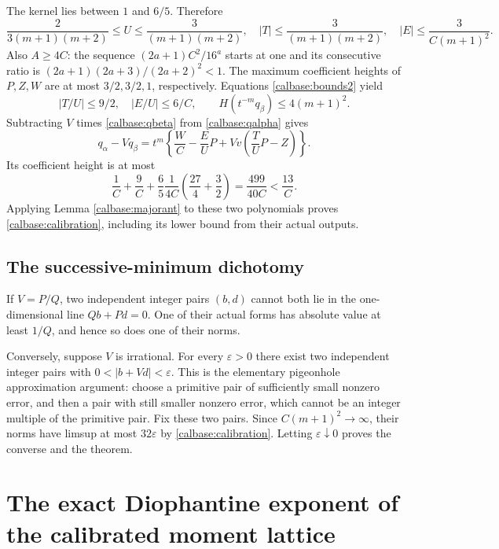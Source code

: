 \documentclass[11pt,a4paper]{article}
\numberwithin{equation}{section}
\theoremstyle{definition}\newtheorem{definition}[theorem]{Definition}
\theoremstyle{remark}\newtheorem{remark}[theorem]{Remark}
\begin{document}
The kernel lies between $1$ and $6/5$. Therefore
\begin{equation}\label{calbase:bounds2}
 \frac2{3(m+1)(m+2)}\le U\le\frac3{(m+1)(m+2)},\quad
 |T|\le\frac3{(m+1)(m+2)},\quad
 |E|\le\frac3{C(m+1)^2}.
\end{equation}
Also $A\ge4C$: the sequence $(2a+1)C^2/16^a$ starts at one
and its consecutive ratio is $(2a+1)(2a+3)/(2a+2)^2<1$.
The maximum coefficient heights of $P,Z,W$ are at most
$3/2,3/2,1$, respectively. Equations \eqref{calbase:bounds2} yield
\[
 |T/U|\le9/2,\quad |E/U|\le6/C,
 \qquad H(t^{-m}q_\beta)\le4(m+1)^2.
\]
Subtracting $V$ times \eqref{calbase:qbeta} from \eqref{calbase:qalpha} gives
\[
 q_\alpha-Vq_\beta
 =t^m\left\{\frac WC-\frac EU P
             +Vv\left(\frac TU P-Z\right)\right\}.
\]
Its coefficient height is at most
\[
 \frac1C+\frac9C+
 \frac{6}{5}\frac1{4C}\left(\frac{27}4+\frac32\right)
 =\frac{499}{40C}<\frac{13}C.
\]
Applying Lemma \ref{calbase:majorant} to these two polynomials proves
\eqref{calbase:calibration}, including its lower bound from their actual outputs.

\subsection{The successive-minimum dichotomy}
If $V=P/Q$, two independent integer pairs $(b,d)$ cannot both
lie in the one-dimensional line $Qb+Pd=0$. One of their actual
forms has absolute value at least $1/Q$, and hence so does one
of their norms.

Conversely, suppose $V$ is irrational. For every $\varepsilon>0$
there exist two independent integer pairs with
$0<|b+Vd|<\varepsilon$. This is the elementary pigeonhole
approximation argument: choose a primitive pair of sufficiently
small nonzero error, and then a pair with still smaller nonzero
error, which cannot be an integer multiple of the primitive pair.
Fix these two pairs. Since $C(m+1)^2\to\infty$, their norms
have limsup at most $32\varepsilon$ by \eqref{calbase:calibration}.
Letting $\varepsilon\downarrow0$ proves the converse and the theorem.



\section{The exact Diophantine exponent of the calibrated moment lattice}
\label{cal:sec:calibrated-exponent}
\end{document}
